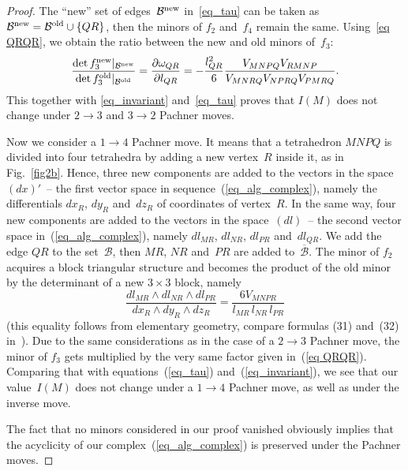 \begin{proof}
The ``new'' set of edges~$\mathcal B^{\rm new}$ in~\eqref{eq_tau} can be taken as $\mathcal B^{\rm new} = \mathcal B^{\rm old} \cup\{QR\}$, then the minors of $f_2$ and~$f_4$ remain the same. Using~\eqref{eq QRQR}, we obtain the ratio between the new and old minors of~$f_3$:
\begin{equation}
\frac{\det f_3^{\rm new} |_{\mathcal B^{\rm new}}}{\det f_3^{\rm old} |_{\mathcal B^{\rm old}}} = \frac{\partial\omega_{QR}}{\partial l_{QR}} = - \frac{l_{QR}^2}{6}\frac{V_{MNPQ}V_{RMNP}}{V_{MNRQ}V_{NPRQ}V_{PMRQ}}  .
\label{eq QRQR minors}
\end{equation}
This together with \eqref{eq_invariant} and~\eqref{eq_tau} proves that $I(M)$ does not change under $2\to 3$ and $3\to 2$ Pachner moves.

Now we consider a $1\to 4$ Pachner move. It means that a tetrahedron $MNPQ$ is divided into four tetrahedra by adding a new vertex~$R$ inside it, as in Fig.~\ref{fig2b}. Hence, three new components are added to the vectors in the space~$(dx)'$~-- the f\/irst vector space in sequence~(\ref{eq_alg_complex}), namely the dif\/ferentials $dx_R$, $dy_R$ and~$dz_R$ of coordinates of vertex~$R$. In the same way, four new components are added to the vectors in the space~$(dl)$~-- the second vector space in~(\ref{eq_alg_complex}), namely $dl_{MR}$, $dl_{NR}$, $dl_{PR}$ and~$dl_{QR}$. We add the edge $QR$ to the set~$\mathcal B$, then $MR$, $NR$ and~$PR$ are added to~$\overline{\mathcal B}$. The minor of $f_2$ acquires a block triangular structure and becomes the product of the old minor by the determinant of a new $3\times 3$ block, namely
\begin{equation*}
\frac{dl_{MR}\wedge dl_{NR}\wedge dl_{PR}}{dx_R\wedge dy_R\wedge dz_R} = \frac{6V_{MNPR}}{l_{MR}\,l_{NR}\,l_{PR}}
\end{equation*}
(this equality follows from elementary geometry, compare formulas (31) and~(32) in~\cite{JNMP1}). Due to the same considerations as in the case of a $2\to 3$ Pachner move, the minor of $f_3$ gets multiplied by the very same factor given in~(\ref{eq QRQR}). Comparing that with equations~(\ref{eq_tau}) and~(\ref{eq_invariant}), we see that our value~$I(M)$ does not change under a $1\to 4$ Pachner move, as well as under the inverse move.

The fact that no minors considered in our proof vanished obviously implies that the acyclicity of our complex~(\ref{eq_alg_complex}) is preserved under the Pachner moves.
\end{proof}
